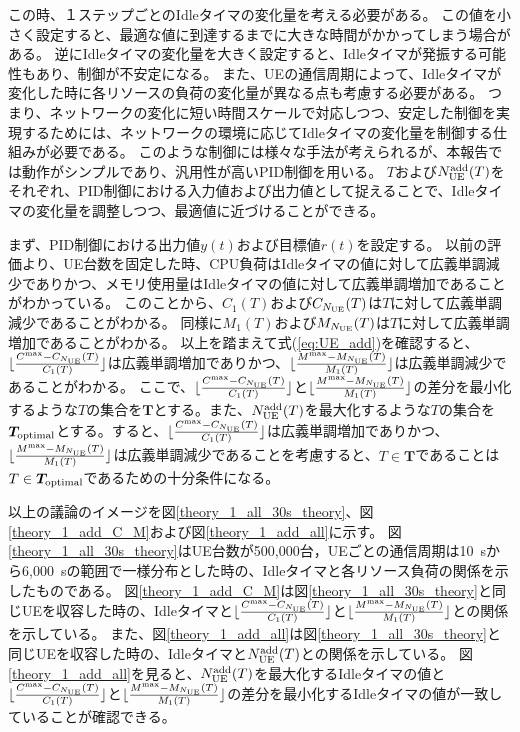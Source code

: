 \documentclass[a4j]{ujarticle}
\begin{document}
この時、１ステップごとのIdleタイマの変化量を考える必要がある。
この値を小さく設定すると、最適な値に到達するまでに大きな時間がかかってしまう場合がある。
逆にIdleタイマの変化量を大きく設定すると、Idleタイマが発振する可能性もあり、制御が不安定になる。
また、UEの通信周期によって、Idleタイマが変化した時に各リソースの負荷の変化量が異なる点も考慮する必要がある。
つまり、ネットワークの変化に短い時間スケールで対応しつつ、安定した制御を実現するためには、ネットワークの環境に応じてIdleタイマの変化量を制御する仕組みが必要である。
このような制御には様々な手法が考えられるが、本報告では動作がシンプルであり、汎用性が高いPID制御を用いる。
$T$および$N_{\rm UE}^{\rm add}(T)$をそれぞれ、PID制御における入力値および出力値として捉えることで、Idleタイマの変化量を調整しつつ、最適値に近づけることができる。

まず、PID制御における出力値$y(t)$および目標値$r(t)$を設定する。
以前の評価より、UE台数を固定した時、CPU負荷はIdleタイマの値に対して広義単調減少でありかつ、メモリ使用量はIdleタイマの値に対して広義単調増加であることがわかっている。
このことから、$C_{1}(T)$および$C_{N_{\rm UE}}(T)$は$T$に対して広義単調減少であることがわかる。
同様に$M_{1}(T)$および$M_{N_{\rm UE}}(T)$は$T$に対して広義単調増加であることがわかる。
以上を踏まえて式(\ref{eq:UE_add})を確認すると、$\lfloor \frac{C^{\rm max} - C_{N_{\rm UE}}(T)}{C_{1}(T)} \rfloor$は広義単調増加でありかつ、$\lfloor \frac{M^{\rm max} - M_{N_{\rm UE}}(T)}{M_{1}(T)} \rfloor$は広義単調減少であることがわかる。
ここで、$\lfloor \frac{C^{\rm max} - C_{N_{\rm UE}}(T)}{C_{1}(T)} \rfloor$と$\lfloor \frac{M^{\rm max} - M_{N_{\rm UE}}(T)}{M_{1}(T)} \rfloor$の差分を最小化するような$T$の集合を$\bm{T}$とする。また、$N_{\rm UE}^{\rm add}(T)$を最大化するような$T$の集合を$\bm{T}_{\rm optimal}$とする。すると、$\lfloor \frac{C^{\rm max} - C_{N_{\rm UE}}(T)}{C_{1}(T)} \rfloor$は広義単調増加でありかつ、$\lfloor \frac{M^{\rm max} - M_{N_{\rm UE}}(T)}{M_{1}(T)} \rfloor$は広義単調減少であることを考慮すると、$T\in\bm{T}$であることは$T\in\bm{T}_{\rm optimal}$であるための十分条件になる。

以上の議論のイメージを図\ref{theory_1_all_30s_theory}、図\ref{theory_1_add_C_M}および図\ref{theory_1_add_all}に示す。
図\ref{theory_1_all_30s_theory}はUE台数が500,000台，UEごとの通信周期は10~sから6,000~sの範囲で一様分布とした時の、Idleタイマと各リソース負荷の関係を示したものである。
図\ref{theory_1_add_C_M}は図\ref{theory_1_all_30s_theory}と同じUEを収容した時の、Idleタイマと$\lfloor \frac{C^{\rm max} - C_{N_{\rm UE}}(T)}{C_{1}(T)} \rfloor$と$\lfloor \frac{M^{\rm max} - M_{N_{\rm UE}}(T)}{M_{1}(T)} \rfloor$との関係を示している。
また、図\ref{theory_1_add_all}は図\ref{theory_1_all_30s_theory}と同じUEを収容した時の、Idleタイマと$N_{\rm UE}^{\rm add}(T)$との関係を示している。
図\ref{theory_1_add_all}を見ると、$N_{\rm UE}^{\rm add}(T)$を最大化するIdleタイマの値と$\lfloor \frac{C^{\rm max} - C_{N_{\rm UE}}(T)}{C_{1}(T)} \rfloor$と$\lfloor \frac{M^{\rm max} - M_{N_{\rm UE}}(T)}{M_{1}(T)} \rfloor$の差分を最小化するIdleタイマの値が一致していることが確認できる。
\end{document}
